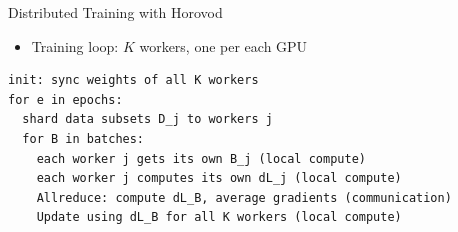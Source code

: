 \begin{frame}[fragile]{Distributed Training with Horovod}
\protect\hypertarget{distributed-training-with-horovod-1}{}

\begin{itemize}
\tightlist
\item
  Training loop: \(K\) workers, one per each GPU
\end{itemize}

\begin{lstlisting}
init: sync weights of all K workers
for e in epochs:
  shard data subsets D_j to workers j
  for B in batches:
    each worker j gets its own B_j (local compute)
    each worker j computes its own dL_j (local compute)
    Allreduce: compute dL_B, average gradients (communication)
    Update using dL_B for all K workers (local compute)
\end{lstlisting}


\end{frame}

